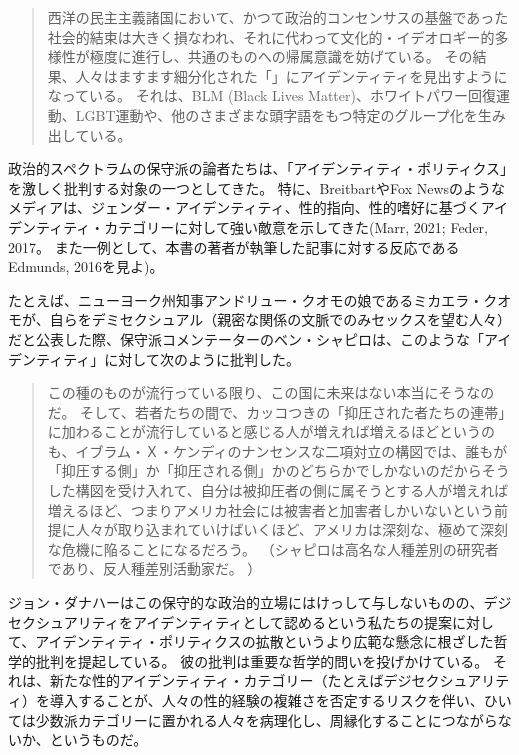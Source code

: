 \documentclass[paper=a4,book,openany]{jlreq} \usepackage{mystyle}
\begin{document}
\begin{quote}
西洋の民主主義諸国において、かつて政治的コンセンサスの基盤であった社会的結束は大きく損なわれ、それに代わって文化的・イデオロギー的多様性が極度に進行し、共通のものへの帰属意識を妨げている。
その結果、人々はますます細分化された「」にアイデンティティを見出すようになっている。
それは、BLM (Black Lives Matter)、ホワイトパワー回復運動、LGBT運動や、他のさまざまな頭字語をもつ特定のグループ化を生み出している。
\citep{gardels18:_franc_fukuy}
\end{quote}

政治的スペクトラムの保守派の論者たちは、「アイデンティティ・ポリティクス」を激しく批判する対象の一つとしてきた。
特に、BreitbartやFox Newsのようなメディアは、ジェンダー・アイデンティティ、性的指向、性的嗜好に基づくアイデンティティ・カテゴリーに対して強い敵意を示してきた(Marr, 2021; Feder, 2017。
また一例として、本書の著者が執筆した記事に対する反応であるEdmunds, 2016を見よ)。
\nocite{edmunds16:_eco_sexual_boast_mastur_water}
\nocite{marr21:_fox_news_has_consis_enabl,feder17:_steve_bannon_gay_agend}

たとえば、ニューヨーク州知事アンドリュー・クオモの娘であるミカエラ・クオモが、自らをデミセクシュアル（親密な関係の文脈でのみセックスを望む人々）だと公表した際、保守派コメンテーターのベン・シャピロは、このような「アイデンティティ」に対して次のように批判した。

\begin{quote}
この種のものが流行っている限り、この国に未来はない{\DDASH}本当にそうなのだ。
そして、若者たちの間で、カッコつきの「抑圧された者たちの連帯」に加わることが流行していると感じる人が増えれば増えるほど{\DDASH}というのも、イブラム・Ｘ・ケンディのナンセンスな二項対立の構図では、誰もが「抑圧する側」か「抑圧される側」かのどちらかでしかないのだから{\DDASH}そうした構図を受け入れて、自分は被抑圧者の側に属そうとする人が増えれば増えるほど、つまりアメリカ社会には被害者と加害者しかいないという前提に人々が取り込まれていけばいくほど、アメリカは深刻な、極めて深刻な危機に陥ることになるだろう。
\citep{shapiro21:_andrew_cuomos_daugh_comes_out_demis} （シャピロは高名な人種差別の研究者であり、反人種差別活動家だ。
）

\end{quote}

ジョン・ダナハーはこの保守的な政治的立場にはけっして与しないものの、デジセクシュアリティをアイデンティティとして認めるという私たちの提案に対して、アイデンティティ・ポリティクスの拡散というより広範な懸念に根ざした哲学的批判を提起している。
彼の批判は重要な哲学的問いを投げかけている。
それは、新たな性的アイデンティティ・カテゴリー（たとえばデジセクシュアリティ）を導入することが、人々の性的経験の複雑さを否定するリスクを伴い、ひいては少数派カテゴリーに置かれる人々を病理化し、周縁化することにつながらないか、というものだ。
\end{document}
